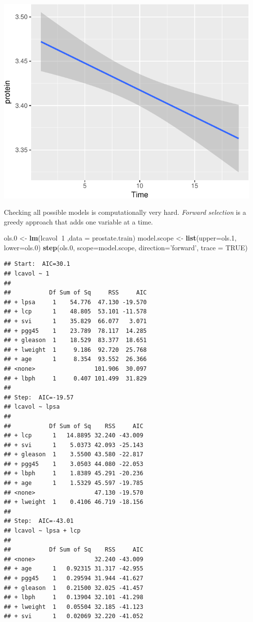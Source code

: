 \documentclass[]{book}
\newenvironment{Shaded}{\begin{snugshade}}{\end{snugshade}}
\newcommand{\DataTypeTok}[1]{\textcolor[rgb]{0.13,0.29,0.53}{#1}}
\newcommand{\DecValTok}[1]{\textcolor[rgb]{0.00,0.00,0.81}{#1}}
\newcommand{\FloatTok}[1]{\textcolor[rgb]{0.00,0.00,0.81}{#1}}
\newcommand{\KeywordTok}[1]{\textcolor[rgb]{0.13,0.29,0.53}{\textbf{#1}}}
\newcommand{\NormalTok}[1]{#1}
\newcommand{\OperatorTok}[1]{\textcolor[rgb]{0.81,0.36,0.00}{\textbf{#1}}}
\newcommand{\OtherTok}[1]{\textcolor[rgb]{0.56,0.35,0.01}{#1}}
\newcommand{\StringTok}[1]{\textcolor[rgb]{0.31,0.60,0.02}{#1}}
\theoremstyle{definition}
\theoremstyle{definition}
\theoremstyle{definition}
\theoremstyle{remark}
\begin{document}
\includegraphics[width=0.5\linewidth]{Rcourse_files/figure-latex/unnamed-chunk-239-1}

Checking all possible models is computationally very hard.
\emph{Forward selection} is a greedy approach that adds one variable at a time.

\begin{Shaded}
\begin{Highlighting}[]
\NormalTok{ols}\FloatTok{.0}\NormalTok{ <-}\StringTok{ }\KeywordTok{lm}\NormalTok{(lcavol}\OperatorTok{~}\DecValTok{1}\NormalTok{ ,}\DataTypeTok{data =}\NormalTok{ prostate.train)}
\NormalTok{model.scope <-}\StringTok{ }\KeywordTok{list}\NormalTok{(}\DataTypeTok{upper=}\NormalTok{ols}\FloatTok{.1}\NormalTok{, }\DataTypeTok{lower=}\NormalTok{ols}\FloatTok{.0}\NormalTok{)}
\KeywordTok{step}\NormalTok{(ols}\FloatTok{.0}\NormalTok{, }\DataTypeTok{scope=}\NormalTok{model.scope, }\DataTypeTok{direction=}\StringTok{'forward'}\NormalTok{, }\DataTypeTok{trace =} \OtherTok{TRUE}\NormalTok{)}
\end{Highlighting}
\end{Shaded}

\begin{verbatim}
## Start:  AIC=30.1
## lcavol ~ 1
## 
##           Df Sum of Sq     RSS     AIC
## + lpsa     1    54.776  47.130 -19.570
## + lcp      1    48.805  53.101 -11.578
## + svi      1    35.829  66.077   3.071
## + pgg45    1    23.789  78.117  14.285
## + gleason  1    18.529  83.377  18.651
## + lweight  1     9.186  92.720  25.768
## + age      1     8.354  93.552  26.366
## <none>                 101.906  30.097
## + lbph     1     0.407 101.499  31.829
## 
## Step:  AIC=-19.57
## lcavol ~ lpsa
## 
##           Df Sum of Sq    RSS     AIC
## + lcp      1   14.8895 32.240 -43.009
## + svi      1    5.0373 42.093 -25.143
## + gleason  1    3.5500 43.580 -22.817
## + pgg45    1    3.0503 44.080 -22.053
## + lbph     1    1.8389 45.291 -20.236
## + age      1    1.5329 45.597 -19.785
## <none>                 47.130 -19.570
## + lweight  1    0.4106 46.719 -18.156
## 
## Step:  AIC=-43.01
## lcavol ~ lpsa + lcp
## 
##           Df Sum of Sq    RSS     AIC
## <none>                 32.240 -43.009
## + age      1   0.92315 31.317 -42.955
## + pgg45    1   0.29594 31.944 -41.627
## + gleason  1   0.21500 32.025 -41.457
## + lbph     1   0.13904 32.101 -41.298
## + lweight  1   0.05504 32.185 -41.123
## + svi      1   0.02069 32.220 -41.052
\end{verbatim}
\end{document}
